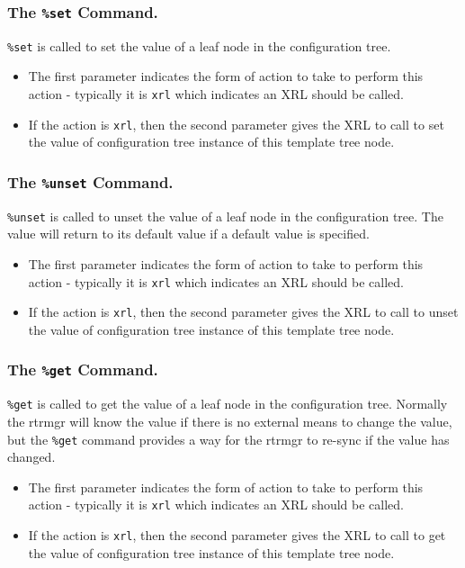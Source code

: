 \documentclass[11pt]{article}
\begin{document}
\subsubsection{The {\tt \%set} Command.}
{\tt \%set} is called to set the value of a leaf node in the
configuration tree.
\begin{itemize}
\item The first parameter indicates the form of action to take to perform
this action - typically it is {\tt xrl} which indicates an XRL should
be called.
\item If the action is {\tt xrl}, then the second parameter gives the XRL to
call to set the value of configuration tree instance of this template
tree node.
\end{itemize}
\subsubsection{The {\tt \%unset} Command.}
{\tt \%unset} is called to unset the value of a leaf node in the
configuration tree.  The value will return to its default value if a
default value is specified.
\begin{itemize}
\item The first parameter indicates the form of action to take to perform
this action - typically it is {\tt xrl} which indicates an XRL should
be called.
\item If the action is {\tt xrl}, then the second parameter gives the XRL to
call to unset the value of configuration tree instance of this template
tree node.
\end{itemize}
\subsubsection{The {\tt \%get} Command.}
{\tt \%get} is called to get the value of a leaf node in the
configuration tree.  Normally the rtrmgr will know the value if there
is no external means to change the value, but the {\tt \%get} command
provides a way for the rtrmgr to re-sync if the value has changed.
\begin{itemize}
\item The first parameter indicates the form of action to take to perform
this action - typically it is {\tt xrl} which indicates an XRL should
be called.
\item If the action is {\tt xrl}, then the second parameter gives the XRL to
call to get the value of configuration tree instance of this template
tree node.
\end{itemize}
\end{document}
